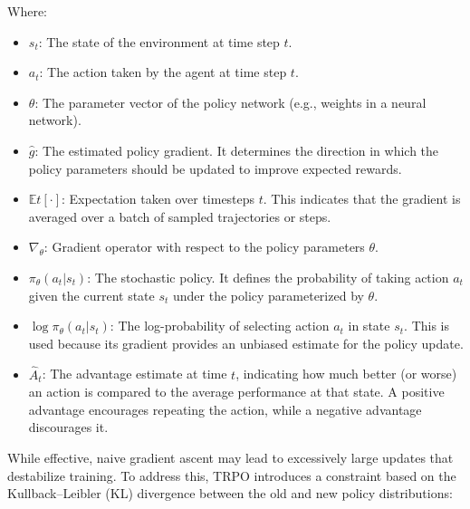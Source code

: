\documentclass[12pt,oneside,openright,a4paper]{cpe-english-project}
\begin{document}
Where:
\begin{itemize}
\item $s_t$: The state of the environment at time step $t$.
\item $a_t$: The action taken by the agent at time step $t$.
\item $\theta$: The parameter vector of the policy network (e.g., weights in a neural network).
\item $\hat{g}$: The estimated policy gradient. It determines the direction in which the policy parameters should be updated to improve expected rewards.
\item $\mathbb{E}t[\cdot]$: Expectation taken over timesteps $t$. This indicates that the gradient is averaged over a batch of sampled trajectories or steps.
\item $\nabla_{\theta}$: Gradient operator with respect to the policy parameters $\theta$.
\item $\pi_{\theta}(a_t | s_t)$: The stochastic policy. It defines the probability of taking action $a_t$ given the current state $s_t$ under the policy parameterized by $\theta$.
\item $\log \pi_{\theta}(a_t | s_t)$: The log-probability of selecting action $a_t$ in state $s_t$. This is used because its gradient provides an unbiased estimate for the policy update.
\item $\hat{A}_t$: The advantage estimate at time $t$, indicating how much better (or worse) an action is compared to the average performance at that state. A positive advantage encourages repeating the action, while a negative advantage discourages it.
\end{itemize}

While effective, naive gradient ascent may lead to excessively large updates that destabilize training. To address this, TRPO introduces a constraint based on the Kullback–Leibler (KL) divergence between the old and new policy distributions:
\end{document}
